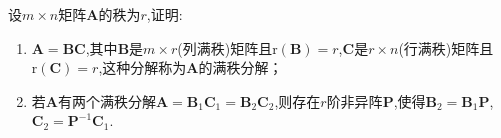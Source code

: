\documentclass[../../main.tex]{subfiles}%
\begin{document}
\begin{proposition}[满秩分解]\label{proposition:矩阵的满秩分解}
设\(m\times n\)矩阵\(\boldsymbol{A}\)的秩为\(r\),证明:
\begin{enumerate}[(1)]
\item \(\boldsymbol{A}=\boldsymbol{B}\boldsymbol{C}\),其中\(\boldsymbol{B}\)是\(m\times r\)(列满秩)矩阵且\(\mathrm{r}(\boldsymbol{B}) = r\),\(\boldsymbol{C}\)是\(r\times n\)(行满秩)矩阵且\(\mathrm{r}(\boldsymbol{C}) = r\),这种分解称为\(\boldsymbol{A}\)的满秩分解；
\item 若\(\boldsymbol{A}\)有两个满秩分解\(\boldsymbol{A}=\boldsymbol{B}_1\boldsymbol{C}_1=\boldsymbol{B}_2\boldsymbol{C}_2\),则存在\(r\)阶非异阵\(\boldsymbol{P}\),使得\(\boldsymbol{B}_2=\boldsymbol{B}_1\boldsymbol{P}\),\(\boldsymbol{C}_2=\boldsymbol{P}^{-1}\boldsymbol{C}_1\).
\end{enumerate}
\end{proposition}
\end{document}
